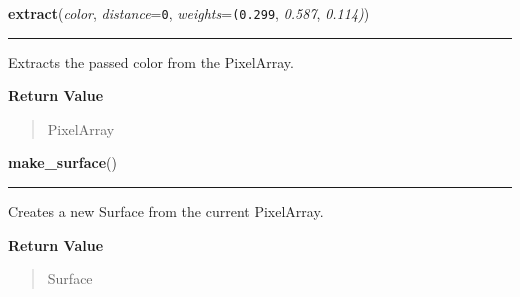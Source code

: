 \hspace{.8\funcindent}\begin{boxedminipage}{\funcwidth}

    \raggedright \textbf{extract}(\textit{color}, \textit{distance}={\tt 0}, \textit{weights}={\tt (0.299}, \textit{0.587}, \textit{0.114)})

    \vspace{-1.5ex}

    \rule{\textwidth}{0.5\fboxrule}
\setlength{\parskip}{2ex}
    Extracts the passed color from the PixelArray.

\setlength{\parskip}{1ex}
      \textbf{Return Value}
    \vspace{-1ex}

      \begin{quote}
      PixelArray

      \end{quote}

    \end{boxedminipage}

    \label{pygame:PixelArray:make_surface}

    \vspace{0.5ex}

\hspace{.8\funcindent}\begin{boxedminipage}{\funcwidth}

    \raggedright \textbf{make\_surface}()

    \vspace{-1.5ex}

    \rule{\textwidth}{0.5\fboxrule}
\setlength{\parskip}{2ex}
    Creates a new Surface from the current PixelArray.

\setlength{\parskip}{1ex}
      \textbf{Return Value}
    \vspace{-1ex}

      \begin{quote}
      Surface

      \end{quote}

    \end{boxedminipage}

    \label{pygame:PixelArray:replace}

    \vspace{0.5ex}

